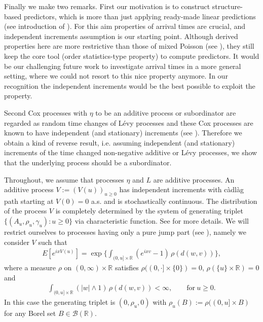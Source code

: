 \documentclass[11pt,leqno%
]{amsart}
\newcommand{\1}{{\mathbf 1}}
\begin{document}
 Finally we make two remarks. 
 First our motivation is to construct
 structure-based predictors, which is more than just applying ready-made linear
 predictions (see introduction of \cite{matsui:mikosch:2010}). For this
 aim properties of arrival times are crucial, and 
 independent increments assumption is our starting point. Although
 derived properties here are more restrictive than those
 of mixed Poisson (see \cite{matsui:rolski:2016}), they 
 still keep the core tool (order statistics-type property) to compute 
 predictors. It would be our challenging future work to investigate arrival times in
 a more general setting, where we could not resort to this nice property anymore.  
 In our recognition the independent increments would be the best
 possible to exploit the property. 

 Second Cox processes with $\eta$ to be an additive process or
 subordinator are regarded as random time changes of L\'evy processes and these Cox
 processes are known to have independent (and stationary) increments (see
 \cite{barndorffnielsen:shiryaev:2015,bochner:2005,sato:1999}). Therefore we obtain a kind of reverse result,
 i.e. assuming independent (and stationary) increments of the time
 changed non-negative additive or L\'evy processes, we show that the underlying
 process should be a subordinator.   

 Throughout, we assume that processes $\eta$ and $L$ are 
 additive processes. 
 An additive process $V:=(V(u))_{u\ge
 0}$ has independent
 increments with c\`adl\`ag path starting at $V(0)=0$ a.s. 
 and is stochastically continuous. 
 The distribution of the process $V$ is completely determined by the system of generating triplet
 $\{(A_u,\rho_u,\gamma_u):u\ge 0\}$ via characteristic function. See
 \cite[Remark 9.9]{sato:1999} for more details. We will restrict ourselves to processes
 having only a pure jump part (see \cite[Theorem 19.3]{sato:1999}), namely    
 we consider $V$ such that
 \begin{align}
\label{chf:additive:process}
 E[ e^{ix V(u)}]=\exp\Big\{
 \int_{(0,u]\times \mathbb{R}} (e^{ixv}-1)\, \rho (d (w,v))
 \Big\},
 \end{align}
 where a measure $\rho$ on $(0,\infty)\times \mathbb{R}$ satisfies
 $\rho ((0,\cdot]\times \{0\})=0$, $\rho (\{u\}\times \mathbb{R})=0$ and
\begin{align}
\label{eq:condi:levym}
\int_{(0,u]\times \mathbb{R}} (|w|\wedge 1)\, \rho (d (w,v))<\infty,\qquad
 \mathrm{for}\ u \ge0.  
 \end{align}
 In this case the generating triplet is $(0,\rho_u,0)$ with $\rho_u(B):=\rho ((0,u]\times B)$ for
 any Borel set $B\in\mathcal B(\mathbb{R})$. 
 
\end{document}
